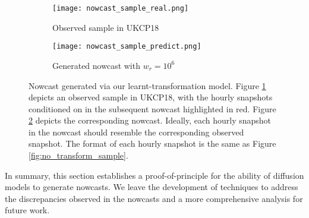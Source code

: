 \documentclass[ oneside,%
                    author={George Herbert},
                    degree={MSci},
                     title={Diffusion Models for Time-Evolving Precipitation Fields},
                  subtitle={}]{dissertation}
\begin{document}
\begin{figure}[htbp]
      \centering
      \begin{subfigure}{\textwidth}
            \texttt{[image: nowcast\_sample\_real.png]}
            \caption{Observed sample in UKCP18}
            \label{fig:nowcast_sample_real}
      \end{subfigure}
      \begin{subfigure}{\textwidth}
            \texttt{[image: nowcast\_sample\_predict.png]}
            \caption{Generated nowcast with $w_r=10^6$}
            \label{fig:nowcast_sample_predict}
      \end{subfigure}
      \caption{Nowcast generated via our learnt-transformation model. Figure \ref{fig:nowcast_sample_real} depicts an observed sample in UKCP18, with the hourly snapshots conditioned on in the subsequent nowcast highlighted in red. Figure \ref{fig:nowcast_sample_predict} depicts the corresponding nowcast. Ideally, each hourly snapshot in the nowcast should resemble the corresponding observed snapshot. The format of each hourly snapshot is the same as Figure \ref{fig:no_transform_sample}.}
      \label{fig:nowcast_sample}
\end{figure}

In summary, this section establishes a proof-of-principle for the ability of diffusion models to generate nowcasts. We leave the development of techniques to address the discrepancies observed in the nowcasts and a more comprehensive analysis for future work.




\end{document}
